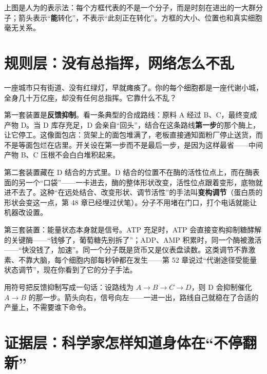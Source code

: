 上图是人为的表示法：每个方框代表的不是一个分子，而是时刻在进出的一大群分子；箭头表示“\textbf{能}转化”，不表示“此刻正在转化”。方框的大小、位置也和真实细胞毫无关系。

\section{规则层：没有总指挥，网络怎么不乱}

一座城市只有街道、没有红绿灯，早就瘫痪了。你的每个细胞都是一座代谢小城，全身几十万亿座，却没有任何总指挥。它靠什么不乱？

第一套装置是\textbf{反馈抑制}。看一条典型的合成路线：原料 A 经过 B、C，最终变成产物 D。当 D 库存充足，D 会亲自“回头”，结合在这条路线\textbf{第一步}的那个酶上，让它停工。这像面包店：货架上的面包堆满了，老板直接通知面粉厂停止送货，而不是等面包烂在店里。开关设在第一步而不是最后一步，是因为这样最省——中间产物 B、C 压根不会白白堆积起来。

第二套装置藏在 D 结合的方式里。D 结合的位置不在酶的活性位点上，而在酶表面的另一个“口袋”——一卡进去，酶的整体形状改变，活性位点跟着变形，底物就进不去了。这种“在远处结合、改变形状、调节活性”的手法叫\textbf{变构调节}（蛋白质的形状会变这一点，第 48 章已经埋过伏笔）。分子不用堵在门口，打个电话就能让机器改设置。

第三套装置：能量状态本身就是信号。ATP 充足时，ATP 会直接变构抑制糖酵解的关键酶——“钱够了，葡萄糖先别拆了”；ADP、AMP 积累时，同一个酶被激活——“快没钱了，加速”。同一个分子既是货币又是仪表盘读数。这类调节不靠激素、不靠大脑，每个细胞内部每秒钟都在发生——第 52 章说过“代谢途径受能量状态调节”，现在你看到了它的分子手法。

用符号把反馈抑制写成一句话：设路线为 $A \rightarrow B \rightarrow C \rightarrow D$，则 D 会抑制催化 $A \rightarrow B$ 的那一步。箭头向右，信号向左——一进一出，路线自己就稳在了合适的产量上，不需要谁下命令。

\section{证据层：科学家怎样知道身体在“不停翻新”}

